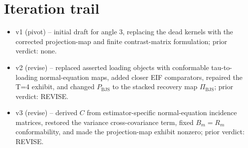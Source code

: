 \documentclass[11pt]{article}
\theoremstyle{definition}
\theoremstyle{plain}
\theoremstyle{remark}
\begin{document}
\section{Iteration trail}
\begin{itemize}[leftmargin=*]
\item v1 (pivot) -- initial draft for angle 3, replacing the dead kernels with
the corrected projection-map and finite contrast-matrix formulation; prior
verdict: none.
\item v2 (revise) -- replaced asserted loading objects with conformable
tau-to-loading normal-equation maps, added closer EIF comparators, repaired the
T=4 exhibit, and changed \(P_{\mathrm{BJS}}\) to the stacked recovery map
\(\Pi_{\mathrm{BJS}}\); prior verdict: REVISE.
\item v3 (revise) -- derived \(C\) from estimator-specific normal-equation
incidence matrices, restored the variance cross-covariance term, fixed
\(B_m=R_m\) conformability, and made the projection-map exhibit nonzero; prior
verdict: REVISE.
\end{itemize}
\end{document}
